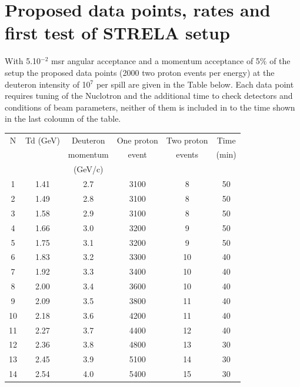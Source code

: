 \documentclass[a4paper,12pt]{article}
\begin{document}
\section{Proposed data points, rates and first test of  STRELA setup}

\hspace{0.5cm}
With 5.10$^{-2}$ msr angular acceptance and a momentum acceptance of 5$\%$
of the setup the proposed data points (2000 two proton events per energy)
at the deuteron intensity of 10$^7$ per spill are given in the Table below.
Each data point requires tuning of the Nuclotron and the additional time to
check detectors and conditions of beam parameters, neither of them is included
in to the time shown in the last coloumn of the table.
\vspace*{5mm}

\begin{tabular}{|c|c|c|c|c|c|}    \hline
  N    &        Td (GeV)&       Deuteron & One proton & Two proton & Time \\
  & &        momentum  & event  & events  & (min) \\
  & &(GeV/c)&   &       &       \\ \hline
  1   & 1.41 &  2.7  &  3100 &  8  &    50 \\  \hline
  2   & 1.49 &  2.8  &  3100 &  8  &    50 \\  \hline
  3   & 1.58 &  2.9  &  3100 &  8  &    50 \\  \hline
  4   & 1.66 &  3.0  &  3200 &  9  &    50 \\  \hline
  5   & 1.75 &  3.1  &  3200 &  9  &    50 \\  \hline
  6   & 1.83 &  3.2  &  3300 &  10 &    40 \\  \hline
  7   & 1.92 &  3.3 &   3400 &  10 &    40 \\  \hline
  8   & 2.00 &  3.4 &   3600 &  10 &    40 \\  \hline
  9   & 2.09 &  3.5 &   3800 &  11 &    40 \\  \hline
  10  & 2.18 &  3.6 &   4200 &  11 &    40 \\  \hline
  11  & 2.27 &  3.7 &   4400 &  12 &    40 \\  \hline
  12  & 2.36 &  3.8 &   4800 &  13 &    30 \\  \hline
  13  & 2.45 &  3.9 &   5100 &  14 &    30 \\  \hline
  14  & 2.54 &  4.0 &   5400 &  15 &    30 \\  \hline
\end{tabular}
\vspace*{5mm}
\end{document}
